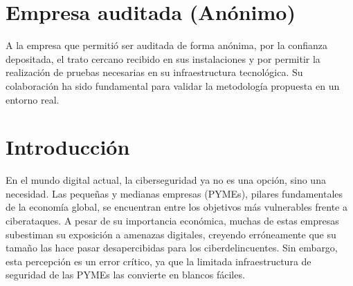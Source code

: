\documentclass[a4paper, 11pt]{article}
\begin{document}
\thispagestyle{nohead}
\section*{Empresa auditada (Anónimo)}

\begin{minipage}{0.7\textwidth}
A la empresa que permitió ser auditada de forma anónima, por la confianza depositada, el trato cercano recibido en sus instalaciones y por permitir la realización de pruebas necesarias en su infraestructura tecnológica. Su colaboración ha sido fundamental para validar la metodología propuesta en un entorno real.
\end{minipage}
\clearpage

\setlength{\parskip}{0.1em}  %

\thispagestyle{nohead}
\renewcommand{\contentsname}{Índice General}
\tableofcontents
\clearpage

\listoffigures
\thispagestyle{nohead}
\clearpage

\listoftables
{}
\thispagestyle{nohead}
\clearpage

\renewcommand{\lstlistlistingname}{Índice de Códigos}
\thispagestyle{nohead}
\lstlistoflistings
{}

\clearpage


\section{Introducción}
\setlength{\parskip}{0.5cm}  %

\thispagestyle{nohead}


En el mundo digital actual, la ciberseguridad ya no es una opción, sino una necesidad. Las pequeñas y medianas empresas (PYMEs), pilares fundamentales de la economía global, se encuentran entre los objetivos más vulnerables frente a ciberataques. A pesar de su importancia económica, 
muchas de estas empresas subestiman su exposición a amenazas digitales, creyendo erróneamente que su tamaño las hace pasar desapercibidas para los ciberdelincuentes. Sin embargo, esta percepción es un error crítico, ya que la limitada infraestructura de seguridad de las 
PYMEs las convierte en blancos fáciles. 
\end{document}
